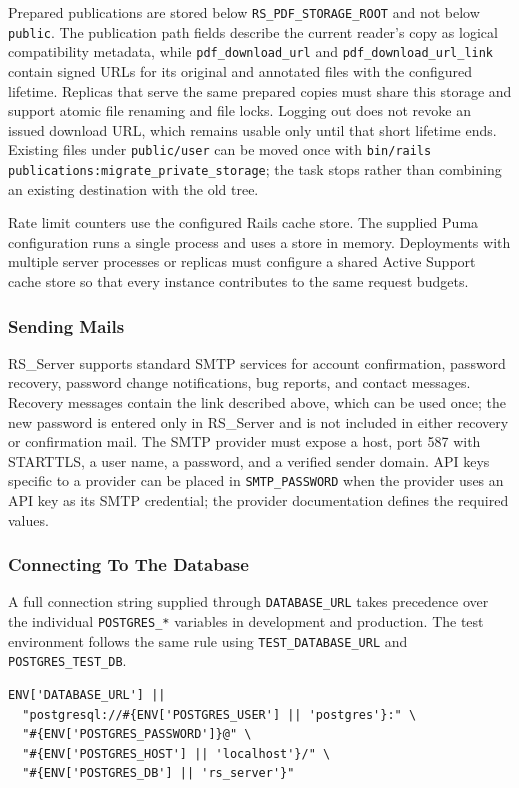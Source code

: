 \documentclass[a4paper, english]{article}
\newcommand{\rsserver}{RS\_Server\xspace}
\begin{document}
Prepared publications are stored below \verb|RS_PDF_STORAGE_ROOT| and not below \verb|public|. The publication path fields describe the current reader's copy as logical compatibility metadata, while \verb|pdf_download_url| and \verb|pdf_download_url_link| contain signed URLs for its original and annotated files with the configured lifetime. Replicas that serve the same prepared copies must share this storage and support atomic file renaming and file locks. Logging out does not revoke an issued download URL, which remains usable only until that short lifetime ends. Existing files under \verb|public/user| can be moved once with \verb|bin/rails publications:migrate_private_storage|; the task stops rather than combining an existing destination with the old tree.

Rate limit counters use the configured Rails cache store. The supplied Puma configuration runs a single process and uses a store in memory. Deployments with multiple server processes or replicas must configure a shared Active Support cache store so that every instance contributes to the same request budgets.

\subsubsection{Sending Mails}

\rsserver supports standard SMTP services for account confirmation, password recovery, password change notifications, bug reports, and contact messages. Recovery messages contain the link described above, which can be used once; the new password is entered only in \rsserver and is not included in either recovery or confirmation mail. The SMTP provider must expose a host, port 587 with STARTTLS, a user name, a password, and a verified sender domain. API keys specific to a provider can be placed in \verb|SMTP_PASSWORD| when the provider uses an API key as its SMTP credential; the provider documentation defines the required values.

\subsubsection{Connecting To The Database}

A full connection string supplied through \verb|DATABASE_URL| takes precedence over the individual \verb|POSTGRES_*| variables in development and production. The test environment follows the same rule using \verb|TEST_DATABASE_URL| and \verb|POSTGRES_TEST_DB|.
\begin{lstlisting}[basicstyle=\scriptsize\ttfamily]
ENV['DATABASE_URL'] ||
  "postgresql://#{ENV['POSTGRES_USER'] || 'postgres'}:" \
  "#{ENV['POSTGRES_PASSWORD']}@" \
  "#{ENV['POSTGRES_HOST'] || 'localhost'}/" \
  "#{ENV['POSTGRES_DB'] || 'rs_server'}"
\end{lstlisting}
\end{document}
